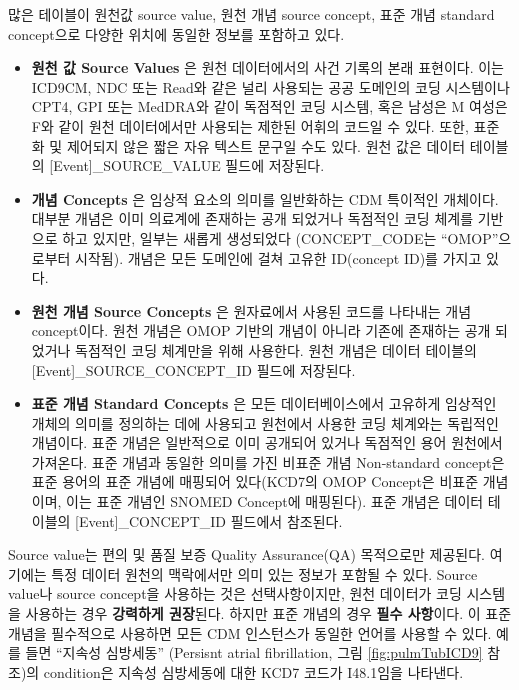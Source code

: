 \documentclass[10.5pt]{book}
\providecommand{\tightlist}{%
  \setlength{\itemsep}{0pt}\setlength{\parskip}{0pt}}
\theoremstyle{definition}
\theoremstyle{definition}
\theoremstyle{definition}
\theoremstyle{remark}
\begin{document}
많은 테이블이 원천값 source value, 원천 개념 source concept, 표준 개념
standard concept으로 다양한 위치에 동일한 정보를 포함하고 있다.

\begin{itemize}
\tightlist
\item
  \textbf{원천 값 Source Values} 은 원천 데이터에서의 사건 기록의 본래
  표현이다. 이는 ICD9CM, NDC 또는 Read와 같은 널리 사용되는 공공
  도메인의 코딩 시스템이나 CPT4, GPI 또는 MedDRA와 같이 독점적인 코딩
  시스템, 혹은 남성은 M 여성은 F와 같이 원천 데이터에서만 사용되는
  제한된 어휘의 코드일 수 있다. 또한, 표준화 및 제어되지 않은 짧은 자유
  텍스트 문구일 수도 있다. 원천 값은 데이터 테이블의
  {[}Event{]}\_SOURCE\_VALUE 필드에 저장된다.
\item
  \textbf{개념 Concepts} 은 임상적 요소의 의미를 일반화하는 CDM 특이적인
  개체이다. 대부분 개념은 이미 의료계에 존재하는 공개 되었거나 독점적인
  코딩 체계를 기반으로 하고 있지만, 일부는 새롭게 생성되었다
  (CONCEPT\_CODE는 ``OMOP''으로부터 시작됨). 개념은 모든 도메인에 걸쳐
  고유한 ID(concept ID)를 가지고 있다.
\item
  \textbf{원천 개념 Source Concepts} 은 원자료에서 사용된 코드를
  나타내는 개념 concept이다. 원천 개념은 OMOP 기반의 개념이 아니라
  기존에 존재하는 공개 되었거나 독점적인 코딩 체계만을 위해 사용한다.
  원천 개념은 데이터 테이블의 {[}Event{]}\_SOURCE\_CONCEPT\_ID 필드에
  저장된다.
\item
  \textbf{표준 개념 Standard Concepts} 은 모든 데이터베이스에서 고유하게
  임상적인 개체의 의미를 정의하는 데에 사용되고 원천에서 사용한 코딩
  체계와는 독립적인 개념이다. 표준 개념은 일반적으로 이미 공개되어
  있거나 독점적인 용어 원천에서 가져온다. 표준 개념과 동일한 의미를 가진
  비표준 개념 Non-standard concept은 표준 용어의 표준 개념에 매핑되어
  있다(KCD7의 OMOP Concept은 비표준 개념이며, 이는 표준 개념인 SNOMED
  Concept에 매핑된다). 표준 개념은 데이터 테이블의
  {[}Event{]}\_CONCEPT\_ID 필드에서 참조된다.
\end{itemize}

Source value는 편의 및 품질 보증 Quality Assurance(QA) 목적으로만
제공된다. 여기에는 특정 데이터 원천의 맥락에서만 의미 있는 정보가 포함될
수 있다. Source value나 source concept을 사용하는 것은 선택사항이지만,
원천 데이터가 코딩 시스템을 사용하는 경우 \textbf{강력하게 권장}된다.
하지만 표준 개념의 경우 \textbf{필수 사항}이다. 이 표준 개념을
필수적으로 사용하면 모든 CDM 인스턴스가 동일한 언어를 사용할 수 있다.
예를 들면 ``지속성 심방세동'' (Persisnt atrial fibrillation, 그림
\ref{fig:pulmTubICD9} 참조)의 condition은 지속성 심방세동에 대한 KCD7
코드가 I48.1임을 나타낸다.
\end{document}
